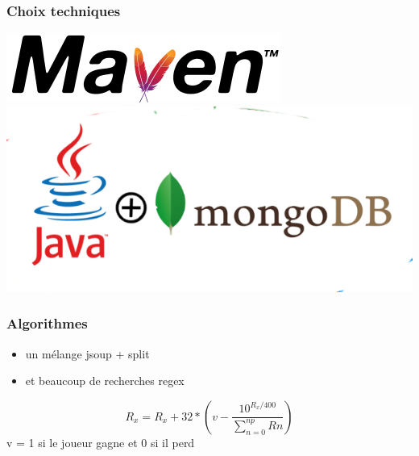 \documentclass{beamer}
\begin{document}
\begin{frame}
  \frametitle{Choix techniques}
\begin{tcolorbox}[colback=green!5,colframe=green!40!black,title=Choix d'implémentation]
  \begin{center}
    \includegraphics[scale=0.30,keepaspectratio]{maven}\\
    \includegraphics[scale=0.30,keepaspectratio]{mongojava}
    \end{center}
\end{tcolorbox}
\end{frame}


\begin{frame}
  \frametitle{Algorithmes}
\begin{tcolorbox}[colback=green!5,colframe=green!40!black,title=Parser]
  \begin{itemize}
  \item un mélange jsoup + split
  \item et beaucoup de recherches regex
  \end{itemize}
\end{tcolorbox}
\begin{tcolorbox}[colback=green!5,colframe=green!40!black,title=Elo]
  \[
    {R_{x}} = {R_{x}} + 32 * (v - \frac{10^{{R_{x}}/400}}{\sum_{n=0}^{np} Rn})
  \]
v = 1 si le joueur gagne et 0 si il perd
\end{tcolorbox}
\end{frame}
\end{document}
